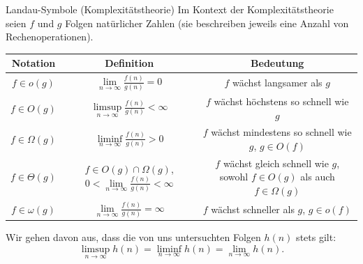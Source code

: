 \begin{frame}{Landau-Symbole (Komplexitätstheorie)}
	Im Kontext der Komplexitätstheorie seien $f$ und $g$ Folgen natürlicher Zahlen (sie beschreiben jeweils eine Anzahl von Rechenoperationen).
	\begin{center}
	\small
	\begin{tabular}{|c|c|c|}
		\hline
		\textbf{Notation} & \textbf{Definition}                                              & \textbf{Bedeutung}                                  \\
		\hline
		$f \in o(g)$      & $\lim\limits_{n \to \infty} \frac{f(n)}{g(n)} = 0$         & $f$ wächst langsamer als $g$                        \\
		\hline
		$f \in O(g)$      & $\limsup\limits_{n \to \infty} \frac{f(n)}{g(n)} < \infty$ & $f$ wächst höchstens so schnell wie $g$             \\
		\hline
		$f \in \Omega(g)$ & $\liminf\limits_{n \to \infty} \frac{f(n)}{g(n)} > 0$      & \makecell{$f$ wächst mindestens so schnell wie $g$, \\$g\in O(f)$}                          \\
		\hline
		$f \in \Theta(g)$ & \makecell{$f \in O(g)\cap \Omega(g)$,                                                                                  \\ $0 < \lim\limits_{n \to \infty} \frac{f(n)}{g(n)} < \infty$} & \makecell{$f$ wächst gleich schnell wie $g$,        \\sowohl $f\in O(g)$ als auch $f\in\Omega(g)$} \\
		\hline
		$f \in \omega(g)$ & $\lim\limits_{n \to \infty} \frac{f(n)}{g(n)} = \infty$    & \makecell{$f$ wächst schneller als $g$,             \\$g\in o(f)$}                                      \\
		\hline
	\end{tabular}
	\end{center}
	Wir gehen davon aus, dass die von uns untersuchten Folgen $h(n)$ stets gilt:
	\[
	\limsup\limits_{n \to \infty} h(n) = \liminf\limits_{n \to \infty} h(n) = \lim\limits_{n \to \infty} h(n).
	\]
\end{frame}

